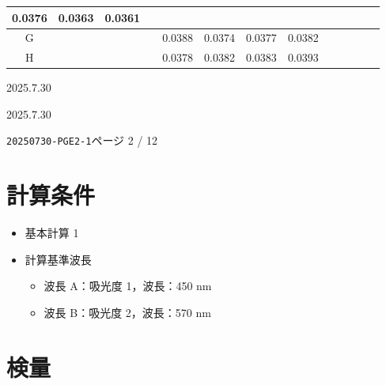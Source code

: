\documentclass[UTF8,10pt,a4paper,fontset=fandol]{ctexart}
\newcommand{\fieldvalue}[1]{#1}
\newcommand{\handwritten}[1]{#1}
\begin{document}
\begin{center}
\begin{tabular}{c|c|c|c|c|c|c|c|c|c|c|c|c}
\fieldvalue{0.0376}&
\fieldvalue{0.0363}&
\fieldvalue{0.0361}&&&\\ \hline
G&&&&
\fieldvalue{0.0388}&
\fieldvalue{0.0374}&
\fieldvalue{0.0377}&
\fieldvalue{0.0382}&&&\\ \hline
H&&&&
\fieldvalue{0.0378}&
\fieldvalue{0.0382}&
\fieldvalue{0.0383}&
\fieldvalue{0.0393}&&&
\end{tabular}
\end{center}

\vfill

\begin{flushright}
\handwritten{2025.7.30}

\handwritten{2025.7.30}
\end{flushright}

\newpage

\noindent\texttt{20250730-PGE2-1}\hfill ページ 2 / 12

\section*{計算条件}

\begin{itemize}
  \item 基本計算 1
  \item 計算基準波長
  \begin{itemize}
    \item 波長 A：吸光度 1，波長：450 nm
    \item 波長 B：吸光度 2，波長：570 nm
  \end{itemize}
\end{itemize}

\section*{検量}
\end{document}
